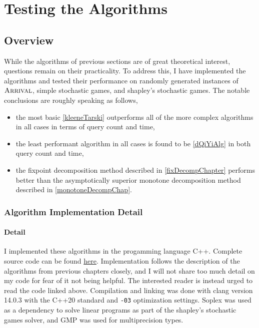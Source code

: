 \chapter{Testing the Algorithms}
\newcommand{\code}[1]{\lstinline|#1|}
\section{Overview}
While the algorithms of previous sections are of great theoretical interest,
questions remain on their practicality. To address this,
I have implemented the algorithms and tested their performance on
randomly generated instances of $\textsc{Arrival}$, simple stochastic games, and
shapley's stochastic games. The notable conclusions are roughly speaking as follows,
\begin{itemize}
  \item the most basic \cref{kleeneTarski} outperforms all of the
more complex algorithms in all cases in terms of query count and time,
\item the least performant algorithm in all cases is found to be \cref{dQiYiAlg} in both
  query count and time,
  \item the fixpoint decomposition method described in \cref{fixDecompChapter} performs better than the asymptotically superior
monotone decomposition method described in \cref{monotoneDecompChap}.
\end{itemize}

\subsection{Algorithm Implementation Detail}
\subsubsection{Detail}
I implemented these algorithms in the progamming language C++. 
Complete source code can be found \href{https://github.com/angusjoshi/tarski}{here}.
Implementation follows the description of the algorithms from previous chapters closely,
and I will not share too much detail on my code for fear of it not being helpful. The interested
reader is instead urged to read the code linked above. Compilation and linking was done with
clang version 14.0.3 with the C++20 standard and \lstinline{-03} optimization settings.
Soplex\citep{soplex} was used as a dependency to solve linear programs
as part of the shapley's stochastic games solver, and GMP\citep{gmp} was used for multiprecision types. \\
